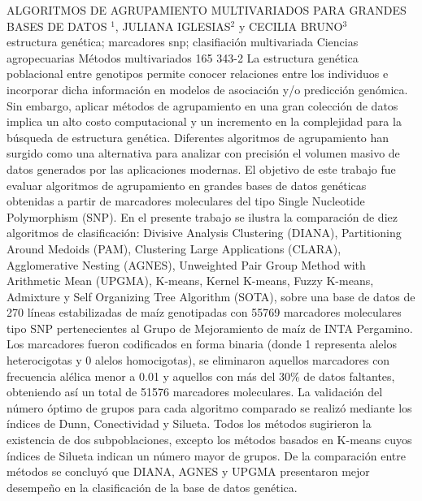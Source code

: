 \A
{ALGORITMOS DE AGRUPAMIENTO MULTIVARIADOS PARA GRANDES BASES DE DATOS}
{$^1$, JULIANA IGLESIAS$^2$ y CECILIA BRUNO$^3$}
{
\\}
{estructura genética; marcadores snp; clasifiación multivariada} 
 {Ciencias agropecuarias} 
 {Métodos multivariados} 
 {165} 
 {343-2}
{La estructura genética poblacional entre genotipos permite conocer relaciones entre los individuos e incorporar dicha información en modelos de asociación y/o predicción genómica. Sin embargo, aplicar métodos de agrupamiento en una gran colección de datos implica un alto costo computacional y un incremento en la complejidad para la búsqueda de estructura genética. Diferentes algoritmos de agrupamiento han surgido como una alternativa para analizar con precisión el volumen masivo de datos generados por las aplicaciones modernas. El objetivo de este trabajo fue evaluar algoritmos de agrupamiento en grandes bases de datos genéticas obtenidas a partir de marcadores moleculares del tipo Single Nucleotide Polymorphism (SNP). En el presente trabajo se ilustra la comparación de diez algoritmos de clasificación: Divisive Analysis Clustering (DIANA), Partitioning Around Medoids (PAM), Clustering Large Applications (CLARA), Agglomerative Nesting (AGNES), Unweighted Pair Group Method with Arithmetic Mean (UPGMA), K-means, Kernel K-means, Fuzzy K-means, Admixture y Self Organizing Tree Algorithm (SOTA), sobre una base de datos de 270 líneas estabilizadas de maíz genotipadas con 55769 marcadores moleculares tipo SNP pertenecientes al Grupo de Mejoramiento de maíz de INTA Pergamino. Los marcadores fueron codificados en forma binaria (donde 1 representa alelos heterocigotas y 0 alelos homocigotas), se eliminaron aquellos marcadores con frecuencia alélica menor a 0.01 y aquellos con más del 30\% de datos faltantes, obteniendo así un total de 51576 marcadores moleculares. La validación del número óptimo de grupos para cada algoritmo comparado se realizó mediante los índices de Dunn, Conectividad y Silueta. Todos los métodos sugirieron la existencia de dos subpoblaciones, excepto los métodos basados en K-means cuyos índices de Silueta indican un número mayor de grupos. De la comparación entre métodos se concluyó que DIANA, AGNES y UPGMA presentaron mejor desempeño en la clasificación de la base de datos genética.}
